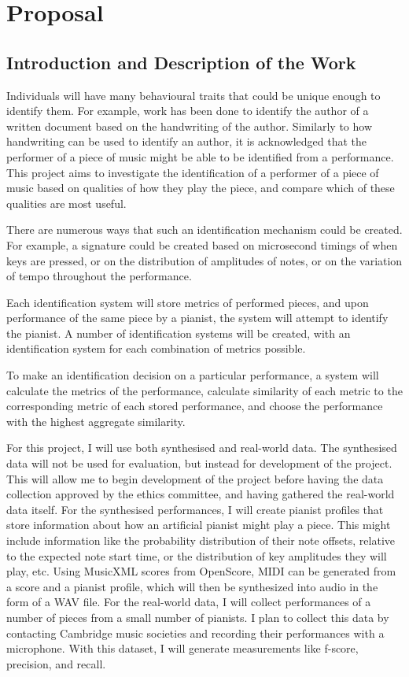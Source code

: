 \documentclass[oneside, 12pt]{book}
\begin{document}

\chapter*{Proposal}

\section*{Introduction and Description of the Work}

Individuals will have many behavioural traits that could be unique enough to identify them. For example, work has been done to identify the author of a written document based on the handwriting of the author. Similarly to how handwriting can be used to identify an author, it is acknowledged that the performer of a piece of music might be able to be identified from a performance. This project aims to investigate the identification of a performer of a piece of music based on qualities of how they play the piece, and compare which of these qualities are most useful.

There are numerous ways that such an identification mechanism could be created. For example, a signature could be created based on microsecond timings of when keys are pressed, or on the distribution of amplitudes of notes, or on the variation of tempo throughout the performance.

Each identification system will store metrics of performed pieces, and upon performance of the same piece by a pianist, the system will attempt to identify the pianist. A number of identification systems will be created, with an identification system for each combination of metrics possible.

To make an identification decision on a particular performance, a system will calculate the metrics of the performance, calculate similarity of each metric to the corresponding metric of each stored performance, and choose the performance with the highest aggregate similarity.

For this project, I will use both synthesised and real-world data. The synthesised data will not be used for evaluation, but instead for development of the project. This will allow me to begin development of the project before having the data collection approved by the ethics committee, and having gathered the real-world data itself. For the synthesised performances, I will create pianist profiles that store information about how an artificial pianist might play a piece. This might include information like the probability distribution of their note offsets, relative to the expected note start time, or the distribution of key amplitudes they will play, etc. Using MusicXML scores from OpenScore, MIDI can be generated from a score and a pianist profile, which will then be synthesized into audio in the form of a WAV file. For the real-world data, I will collect performances of a number of pieces from a small number of pianists. I plan to collect this data by contacting Cambridge music societies and recording their performances with a microphone. With this dataset, I will generate measurements like f-score, precision, and recall.
\end{document}
